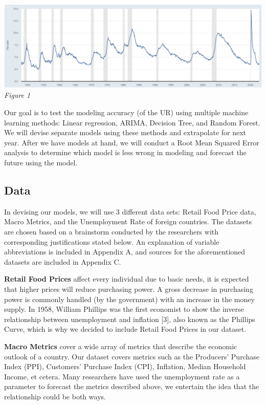\documentclass{article}
\begin{document}
	\begin{center}
		\includegraphics[width=1\textwidth]{assets/intro.png}
		\textit{Figure 1}
	\end{center}
	Our goal is to test the modeling accuracy (of the UR) using multiple machine learning methods: Linear regression, ARIMA, Decision Tree, and Random Forest. We will devise separate models using these methods and extrapolate for next year. After we have models at hand, we will conduct a Root Mean Squared Error analysis to determine which model is less wrong in modeling and forecast the future using the model.

	\subsection{Data}
	In devising our models, we will use 3 different data sets: Retail Food Price data, Macro Metrics, and the Unemployment Rate of foreign countries. The datasets are chosen based on a brainstorm conducted by the researchers with corresponding justifications stated below. An explanation of variable abbreviations is included in Appendix A, and sources for the aforementioned datasets are included in Appendix C.

	\textbf{Retail Food Prices} affect every individual due to basic needs, it is expected that higher prices will reduce purchasing power. A gross decrease in purchasing power is commonly handled (by the government) with an increase in the money supply. In 1958, William Phillips was the first economist to show the inverse relationship between unemployment and inflation [3], also known as the Phillips Curve, which is why we decided to include Retail Food Prices in our dataset.
	
	\textbf{Macro Metrics} cover a wide array of metrics that describe the economic outlook of a country. Our dataset covers metrics such as the Producers' Purchase Index (PPI), Customers' Purchase Index (CPI), Inflation, Median Household Income, et cetera. Many researchers have used the unemployment rate as a parameter to forecast the metrics described above, we entertain the idea that the relationship could be both ways.
	
\end{document}
